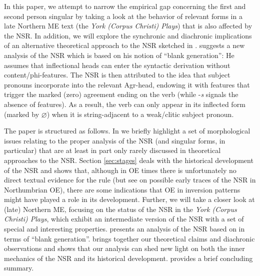 \documentclass[output=paper]{langsci/langscibook}
\begin{document}
In this paper, we attempt to narrow the empirical gap concerning the first and
second person singular by taking a look at the behavior of relevant forms in a
late Northern \gls{ME} text (the \emph{York (Corpus Christi)
Plays}) that is also affected by the \gls{NSR}. In
addition, we will explore the synchronic and diachronic implications of an
alternative theoretical approach to the \gls{NSR} sketched in
\textcite{Roberts:2010}. \citeauthor{Roberts:2010} suggests a new analysis of
the \gls{NSR} which is based on his notion of ``blank
generation'': He assumes that inflectional heads can enter the syntactic
derivation without content/phi-features. The \gls{NSR} is then attributed to the idea that subject pronouns incorporate into the
relevant Agr-head, endowing it with features that trigger the marked (zero)
agreement ending on the verb (while -\emph{s} signals the absence of 
features). As a result, the verb can only appear in its inflected form (marked
by $\varnothing$) when it is string-adjacent to a weak/clitic subject
pronoun.

The paper is structured as follows. In  we
briefly highlight a set of morphological issues relating to the proper analysis
of the \gls{NSR} (and singular forms, in particular) that are at least in part
only rarely discussed in theoretical approaches to the \gls{NSR}. Section
\ref{sec:stages} deals with the historical development of the \gls{NSR} and
shows that, although in \gls{OE} times there is unfortunately no direct textual
evidence for the rule (but see \citealt{Cole2014} on possible early traces of
the \gls{NSR} in Northumbrian \gls{OE}), there are some indications that
\gls{OE}  in inversion patterns might have played a role in
its development. Further, we will take a closer look at (late) Northern ME,
focusing on the status of the \gls{NSR} in the \emph{York (Corpus Christi)
Plays}, which exhibit an intermediate version of the \gls{NSR} with a set of
special and interesting properties. 
presents an analysis of the \gls{NSR} based on
\textcite{Roberts:2010} \nocite{Roberts:2010} in terms of ``blank generation''.
 brings together our theoretical claims and
diachronic observations and shows that our analysis can shed new light on both
the inner mechanics of the \gls{NSR} and its
historical development.   provides a brief concluding
summary.
\end{document}
